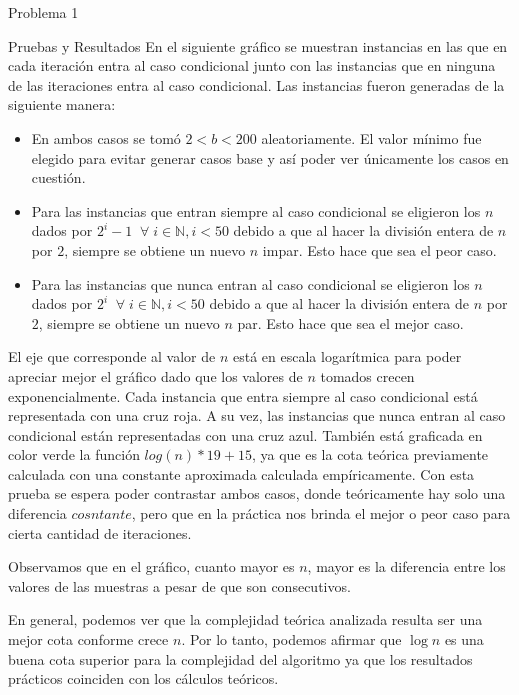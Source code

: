 \begin{section}{Problema 1}
\begin{subsection}{Pruebas y Resultados}
En el siguiente gráfico se muestran instancias en las que en cada iteración entra al caso condicional junto con las instancias que en ninguna de las iteraciones entra al caso condicional. Las instancias fueron generadas de la siguiente manera:
\begin{itemize}
	\item En ambos casos se tomó $2 < b < 200$ aleatoriamente. El valor mínimo fue elegido para evitar generar casos base y así poder ver únicamente los casos en cuestión.
	\item Para las instancias que entran siempre al caso condicional se eligieron los $n$ dados por $2^i-1\;\;\forall\; i\in\mathbb{N}, i < 50$ debido a que al hacer la división entera de $n$ por $2$, siempre se obtiene un nuevo $n$ impar. Esto hace que sea el peor caso.
	\item Para las instancias que nunca entran al caso condicional se eligieron los $n$ dados por $2^i\;\;\forall\; i\in\mathbb{N}, i < 50$ debido a que al hacer la división entera de $n$ por $2$, siempre se obtiene un nuevo $n$ par. Esto hace que sea el mejor caso.
\end{itemize}
El eje que corresponde al valor de $n$ está en escala logarítmica para poder apreciar mejor el gráfico dado que los valores de $n$ tomados crecen exponencialmente. Cada instancia que entra siempre al caso condicional está representada con una cruz roja. A su vez, las instancias que nunca entran al caso condicional están representadas con una cruz azul. También está graficada en color verde la función $log(n)*19+15$, ya que es la cota teórica previamente calculada con una constante aproximada calculada empíricamente. 
	Con esta prueba se espera poder contrastar ambos casos, donde teóricamente hay solo una diferencia $cosntante$, pero que en la práctica nos brinda el mejor o peor caso para cierta cantidad de iteraciones. \\
		\VSP

Observamos que en el gráfico, cuanto mayor es $n$, mayor es la diferencia entre los valores de las muestras a pesar de que son consecutivos.

		En general, podemos ver que la complejidad teórica analizada resulta ser una mejor cota conforme crece $n$. Por lo tanto, podemos afirmar que $\log n$ es una buena cota superior para la complejidad del algoritmo ya que los resultados prácticos coinciden con los cálculos teóricos.
	\end{subsection}

\end{section}

